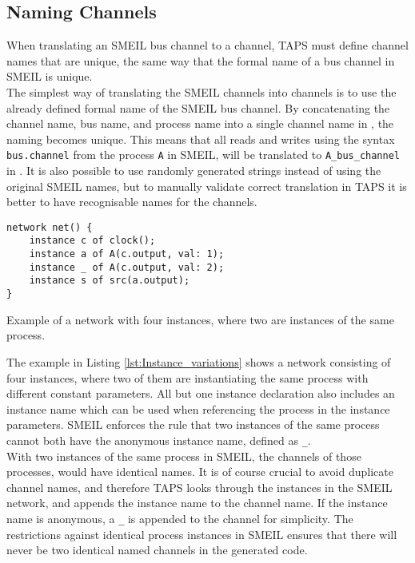 \subsection{Naming Channels}
When translating an SMEIL bus channel to a \cspm{} channel, TAPS must define \cspm{} channel names that are unique, the same way that the formal name of a bus channel in SMEIL is unique.\\

The simplest way of translating the SMEIL channels into \cspm{} channels is to use the already defined formal name of the SMEIL bus channel. By concatenating the channel name, bus name, and process name into a single channel name in \cspm{}, the naming becomes unique.
This means that all reads and writes using the syntax \texttt{bus.channel} from the process \texttt{A} in SMEIL, will be translated to \texttt{A\_bus\_channel} in \cspm{}.
It is also possible to use randomly generated strings instead of using the original SMEIL names, but to manually validate correct translation in TAPS it is better to have recognisable names for the \cspm{} channels.\\

\begin{listing}
\begin{verbatim}
network net() {
    instance c of clock();
    instance a of A(c.output, val: 1);
    instance _ of A(c.output, val: 2);
    instance s of src(a.output);
}
\end{verbatim}
\caption{Example of a network with four instances, where two are instances of the same process.}
\label{lst:Instance_variations}
\end{listing}
The example in Listing \ref{lst:Instance_variations} shows a network consisting of four instances, where two of them are instantiating the same process with different constant parameters. All but one instance declaration also includes an instance name which can be used when referencing the process in the instance parameters. SMEIL enforces the rule that two instances of the same process cannot both have the anonymous instance name, defined as \texttt{\_}.\\

With two instances of the same process in SMEIL, the \cspm{} channels of those processes, would have identical names. It is of course crucial to avoid duplicate channel names, and therefore TAPS looks through the instances in the SMEIL network, and appends the instance name to the \cspm{} channel name. If the instance name is anonymous, a \texttt{\_} is appended to the \cspm{} channel for simplicity. The restrictions against identical process instances in SMEIL ensures that there will never be two identical named \cspm{} channels in the generated code. \\

